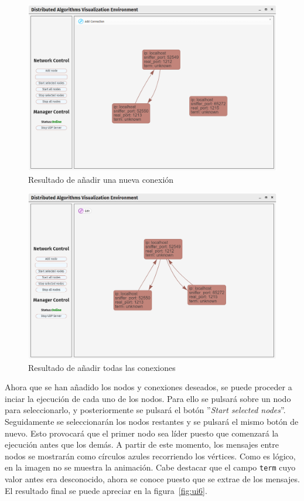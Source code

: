 \begin{figure}[p]
  \centering
  \includegraphics[width=0.9\linewidth]{imagenes/ui4}
  \caption{Resultado de añadir una nueva conexión}
  \label{fig:ui4}
\end{figure}

\begin{figure}[p]
  \centering
  \includegraphics[width=0.9\linewidth]{imagenes/ui5}
  \caption{Resultado de añadir todas las conexiones}
  \label{fig:ui5}
\end{figure}

Ahora que se han añadido los nodos y conexiones deseados, se puede proceder a inciar la ejecución de cada uno de los nodos. Para ello se pulsará sobre un nodo para seleccionarlo, y posteriormente se pulsará el botón ''\textit{Start selected nodes}''. Seguidamente se seleccionarán los nodos restantes y se pulsará el mismo botón de nuevo. Esto provocará que el primer nodo sea líder puesto que comenzará la ejecución antes que los demás. A partir de este momento, los mensajes entre nodos se mostrarán como círculos azules recorriendo los vértices. Como es lógico, en la imagen no se muestra la animación. Cabe destacar que el campo \texttt{term} cuyo valor antes era desconocido, ahora se conoce puesto que se extrae de los mensajes. El resultado final se puede apreciar en la figura~\ref{fig:ui6}.

